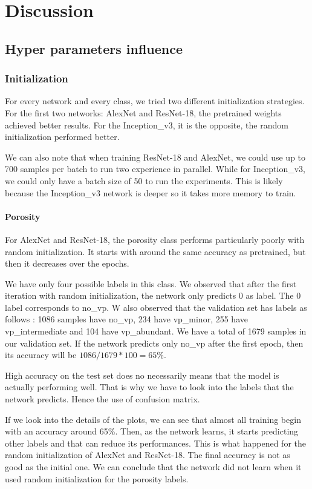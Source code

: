 \chapter{Discussion}\label{chp:discussion}
\section{Hyper parameters influence}
\subsection{Initialization}

For every network and every class, we tried two different initialization strategies. For the first two networks: AlexNet and ResNet-18, the pretrained weights achieved better results. For the Inception\_v3, it is the opposite, the random initialization performed better. 

We can also note that when training ResNet-18 and AlexNet, we could use up to 700 samples per batch to run two experience in parallel. While for Inception\_v3, we could only have a batch size of 50 to run the experiments. This is likely because the Inception\_v3  network is deeper so it takes more memory to train.


\subsubsection{Porosity}
For AlexNet and ResNet-18, the porosity class performs particularly poorly with random initialization. It starts with around the same accuracy as pretrained, but then it decreases over the epochs. 

We have only four possible labels in this class. We observed that after the first iteration with random initialization, the network only predicts 0 as label. The 0 label corresponds to no\_vp.
W also observed that the validation set has labels as follows : 1086 samples have no\_vp, 234 have vp\_minor, 255 have vp\_intermediate and 104 have vp\_abundant. We have a total of 1679 samples in our validation set. If the network predicts only no\_vp after the first epoch, then its accuracy will be \(1086/1679 * 100 = 65\%\). 

High accuracy on the test set does no necessarily means that the model is actually performing well. That is why we have to look into the labels that the network predicts. Hence the use of confusion matrix. 

If we look into the details of the plots, we can see that almost all training begin with an accuracy around 65\%. Then, as the network learns, it starts predicting other labels and that can reduce its performances. This is what happened for the random initialization of AlexNet and ResNet-18. The final accuracy is not as good as the initial one. We can conclude that the network did not learn when it used random initialization for the porosity labels.

